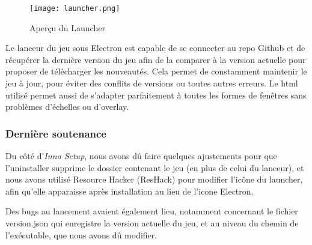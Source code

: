         \begin{figure}[hbt!]
            \centering
            \texttt{[image: launcher.png]}
            \caption{Aperçu du Launcher}
        \end{figure}
        \FloatBarrier

        Le lanceur du jeu sous Electron est capable de se connecter au repo Github et de récupérer la 
        dernière version du jeu afin de la comparer à la version actuelle pour proposer de télécharger les nouveautés. 
        Cela permet de constamment maintenir le jeu à jour, pour éviter des conflits de versions 
        ou toutes autres erreurs. Le html utilisé permet aussi de s'adapter parfaitement à toutes les formes de 
        fenêtres sans problèmes d'échelles ou d'overlay.

    \vspace{0.5cm}
    \subsubsection{Dernière soutenance}
    \vspace{0.5cm}

        Du côté d'\textit{Inno Setup}, nous avons dû faire quelques ajustements pour que l'uninstaller supprime le dossier 
        contenant le jeu (en plus de celui du lanceur), et nous avons utilisé Resource Hacker (ResHack) pour modifier l'icône 
        du launcher, afin qu'elle apparaisse après installation au lieu de l'icone Electron.

        Des bugs au lancement avaient également lieu, notamment concernant le fichier version.json qui enregistre la version actuelle du jeu, 
        et au niveau du chemin de l'exécutable, que nous avons dû modifier.
    

